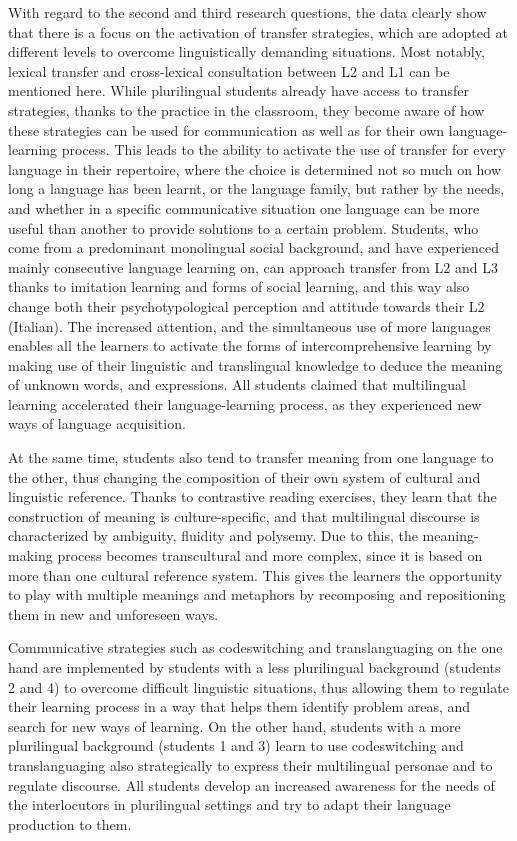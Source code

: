 \documentclass[output=paper]{../langscibook}
\begin{document}
With regard to the second and third research questions, the data clearly show that there is a focus on the activation of transfer strategies, which are adopted at different levels to overcome linguistically demanding situations. Most notably, lexical transfer and cross-lexical consultation between L2 and L1 can be mentioned here. While plurilingual students already have access to transfer strategies, thanks to the practice in the classroom, they become aware of how these strategies can be used for communication as well as for their own language-learning process. This leads to the ability to activate the use of transfer for every language in their repertoire, where the choice is determined not so much on how long a language has been learnt, or the language family, but rather by the needs, and whether in a specific communicative situation one language can be more useful than another to provide solutions to a certain problem. Students, who come from a predominant monolingual social background, and have experienced mainly consecutive language learning on, can approach transfer from L2 and L3 thanks to imitation learning and forms of social learning, and this way also change both their psychotypological perception and attitude towards their L2 (Italian). The increased attention, and the simultaneous use of more languages enables all the learners to activate the forms of intercomprehensive learning by making use of their linguistic and translingual knowledge to deduce the meaning of unknown words, and expressions. All students claimed that multilingual learning accelerated their language-learning process, as they experienced new ways of language acquisition. 

At the same time, students also tend to transfer meaning from one language to the other, thus changing the composition of their own system of cultural and linguistic reference. Thanks to contrastive reading exercises, they learn that the construction of meaning is culture-specific, and that multilingual discourse is characterized by ambiguity, fluidity and polysemy. Due to this, the meaning-making process becomes transcultural and more complex, since it is based on more than one cultural reference system. This gives the learners the opportunity to play with multiple meanings and metaphors by recomposing and repositioning them in new and unforeseen ways. 

Communicative strategies such as codeswitching and translanguaging on the one hand are implemented by students with a less plurilingual background (students 2 and 4) to overcome difficult linguistic situations, thus allowing them to regulate their learning process in a way that helps them identify problem areas, and search for new ways of learning. On the other hand, students with a more plurilingual background (students 1 and 3) learn to use codeswitching and translanguaging also strategically to express their multilingual personae and to regulate discourse. All students develop an increased awareness for the needs of the interlocutors in plurilingual settings and try to adapt their language production to them. 
\end{document}
